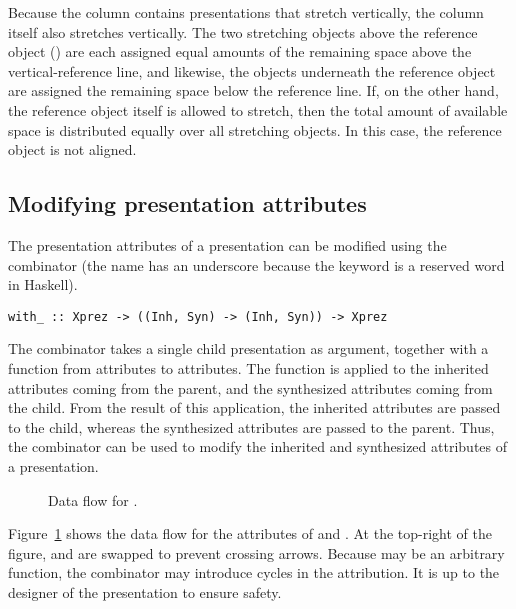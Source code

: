 Because the column contains presentations that stretch vertically, the column itself also stretches vertically. The two stretching objects above the reference object () are each assigned equal amounts of the remaining space above the vertical-reference line, and likewise, the objects underneath the reference object are assigned the remaining space below the reference line. If, on the other hand, the reference object itself is allowed to stretch, then the total amount of available space is distributed equally over all stretching objects. In this case, the reference object is not aligned. 

%																
\subsection{Modifying presentation attributes}

The presentation attributes of a presentation can be modified using the  combinator (the name has an underscore because the keyword  is a reserved word in Haskell).

\begin{small}
\begin{verbatim}
with_ :: Xprez -> ((Inh, Syn) -> (Inh, Syn)) -> Xprez
\end{verbatim}
\end{small}

The combinator takes a single child presentation as argument, together with a function from attributes to attributes. The function is applied to the inherited attributes coming from the parent, and the synthesized attributes coming from the child. From the result of this application, the inherited attributes are passed to the child, whereas the synthesized attributes are passed to the parent. Thus, the  combinator can be used to modify the inherited and synthesized attributes of a presentation.

\begin{figure}[t]
\begin{center}
\caption{Data flow for .}\label{withDataFlow} 
\end{center}
\end{figure}


Figure~\ref{withDataFlow} shows the data flow for the attributes of  and . At the top-right of the figure,  and  are swapped to prevent crossing arrows. Because  may be an arbitrary function, the combinator may introduce cycles in the attribution. It is up to the designer of the presentation to ensure safety.

